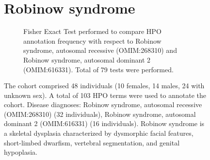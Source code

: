 \begin{figure}[htbp]
\section*{Robinow syndrome}
\centering
\begin{subfigure}[b]{0.95\textwidth}
\centering
{}
\captionsetup{justification=raggedright,singlelinecheck=false}
\caption{Fisher Exact Test performed to compare HPO annotation frequency with respect to Robinow syndrome, autosomal recessive (OMIM:268310) and Robinow syndrome, autosomal dominant 2 (OMIM:616331). Total of
        79 tests were performed. }
\end{subfigure}
\vspace{2em}
\caption{The cohort comprised 48 individuals (10 females, 14 males, 24 with unknown sex). A total of 103 HPO terms were used to annotate the cohort. Disease diagnoses: Robinow syndrome, autosomal recessive (OMIM:268310) (32 individuals), Robinow syndrome, autosomal dominant 2 (OMIM:616331) (16 individuals). Robinow syndrome is a skeletal dysplasia characterized by dysmorphic facial features, short-limbed dwarfism, vertebral segmentation, and genital hypoplasia.}
\end{figure}
